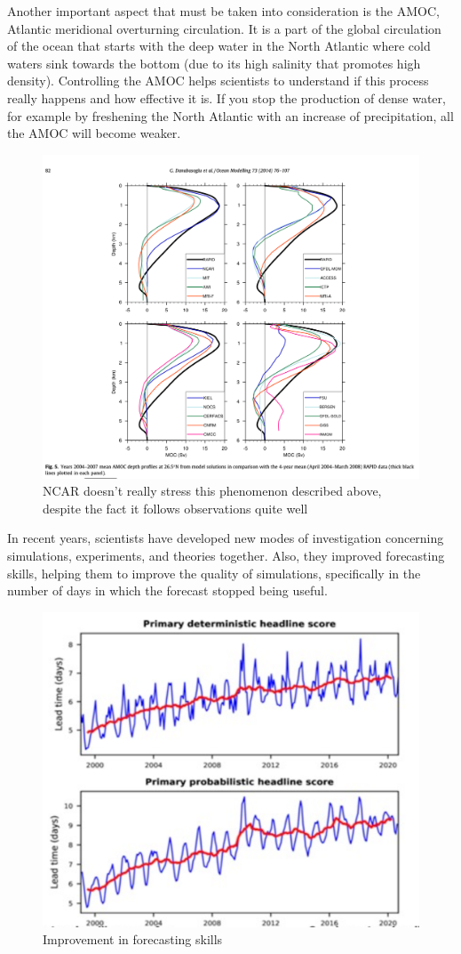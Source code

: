 Another important aspect that must be taken into consideration is the AMOC, Atlantic meridional overturning circulation. It is a part of the global circulation of the ocean that starts with the deep water in the North Atlantic where cold waters sink towards the bottom (due to its high salinity that promotes high density).
Controlling the AMOC helps scientists to understand if this process really happens and how effective it is.
If you stop the production of dense water, for example by freshening the North Atlantic with an increase of precipitation, all the AMOC will become weaker.

\begin{figure}[htp!]
	\centering
	\includegraphics[width=0.5\linewidth]{uploads/image3.png}
	\caption{NCAR doesn't really stress this phenomenon described above, despite the fact it follows observations quite well}
	\label{fig:enter-label}
\end{figure}

In recent years, scientists have developed new modes of investigation concerning simulations, experiments, and theories together. Also, they improved forecasting skills, helping them to improve the quality of simulations, specifically in the number of days in which the forecast stopped being useful.
\begin{figure}[htp!]
	\centering
	\includegraphics[width=0.4\linewidth]{uploads/image5.png}
	\caption{Improvement in forecasting skills}
	\label{fig:enter-label}
\end{figure}

